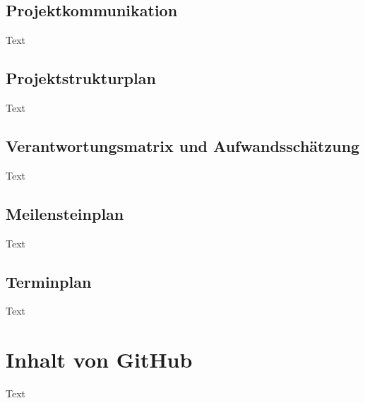 \subsection{Projektkommunikation}
Text
\subsection{Projektstrukturplan}
Text
\subsection{Verantwortungsmatrix und Aufwandsschätzung}
Text
\subsection{Meilensteinplan}
Text
\subsection{Terminplan}
Text


\section{Inhalt von GitHub}
Text






